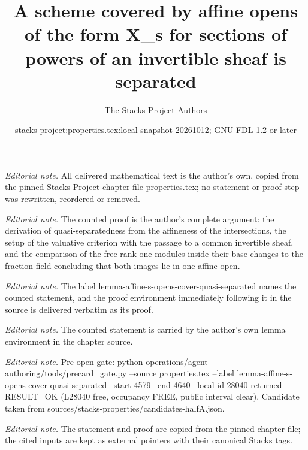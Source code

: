 \documentclass[10pt,a4paper]{amsart}
\title{A scheme covered by affine opens of the form X\_s for sections of powers of an invertible sheaf is separated}
\author{The Stacks Project Authors}
\date{stacks-project:properties.tex:local-snapshot-20261012; GNU FDL 1.2 or later}
\theoremstyle{plain}
\theoremstyle{definition}
\theoremstyle{remark}
\numberwithin{equation}{subsection}
\begin{document}
\maketitle
\noindent\textit{Editorial note.} All delivered mathematical text is the author's own, copied from the pinned Stacks Project chapter file properties.tex; no statement or proof step was rewritten, reordered or removed.\par\medskip
\noindent\textit{Editorial note.} The counted proof is the author's complete argument: the derivation of quasi-separatedness from the affineness of the intersections, the setup of the valuative criterion with the passage to a common invertible sheaf, and the comparison of the free rank one modules inside their base changes to the fraction field concluding that both images lie in one affine open.\par\medskip
\noindent\textit{Editorial note.} The label lemma-affine-s-opens-cover-quasi-separated names the counted statement, and the proof environment immediately following it in the source is delivered verbatim as its proof.\par\medskip
\noindent\textit{Editorial note.} The counted statement is carried by the author's own lemma environment in the chapter source.\par\medskip
\noindent\textit{Editorial note.} Pre-open gate: python operations/agent-authoring/tools/precard\_gate.py --source properties.tex --label lemma-affine-s-opens-cover-quasi-separated --start 4579 --end 4640 --local-id 28040 returned RESULT=OK (L28040 free, occupancy FREE, public interval clear). Candidate taken from sources/stacks-properties/candidates-halfA.json.\par\medskip
\noindent\textit{Editorial note.} The statement and proof are copied from the pinned chapter file; the cited inputs are kept as external pointers with their canonical Stacks tags.\par\medskip
\end{document}

